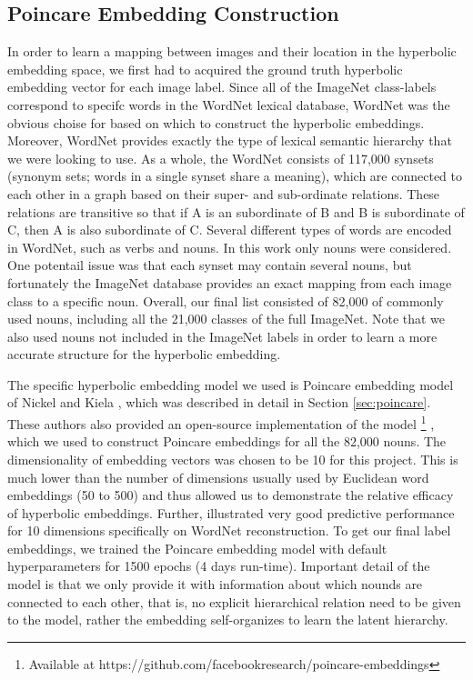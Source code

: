 \documentclass[12pt]{report}
\begin{document}
\subsection{Poincare Embedding Construction}
In order to learn a mapping between images and their location in the hyperbolic embedding space, we first had to acquired the ground truth hyperbolic embedding vector for each image label. Since all of the ImageNet class-labels correspond to specifc words in the WordNet lexical database, WordNet was the obvious choise for based on which to construct the hyperbolic embeddings. Moreover, WordNet provides exactly the type of lexical semantic hierarchy that we were looking to use. As a whole, the WordNet consists of 117,000 synsets (synonym sets; words in a single synset share a meaning), which are connected to each other in a graph based on their super- and sub-ordinate relations. These relations are transitive so that if A is an subordinate of B and B is subordinate of C, then A is also subordinate of C. Several different types of words are encoded in WordNet, such as verbs and nouns. In this work only nouns were considered. One potentail issue was that each synset may contain several nouns, but fortunately the ImageNet database provides an exact mapping from each image class to a specific noun. Overall, our final list consisted of 82,000 of commonly used nouns, including all the 21,000 classes of the full ImageNet. Note that we also used nouns not included in the ImageNet labels in order to learn a more accurate structure for the hyperbolic embedding.

The specific hyperbolic embedding model we used is Poincare embedding model of Nickel and Kiela \cite{Nickel2017}, which was described in detail in Section \ref{sec:poincare}. These authors also provided an open-source implementation of the model \footnote{\label{fb_fn} Available at https://github.com/facebookresearch/poincare-embeddings} , which we used to construct Poincare embeddings for all the 82,000 nouns. The dimensionality of embedding vectors was chosen to be 10 for this project. This is much lower than the number of dimensions usually used by Euclidean word embeddings (50 to 500) and thus allowed us to demonstrate the relative efficacy of hyperbolic embeddings. Further, \cite{Nickel2017} illustrated very good predictive performance for 10 dimensions specifically on WordNet reconstruction. To get our final label embeddings, we trained the Poincare embedding model with default hyperparameters for 1500 epochs (4 days run-time). Important detail of the model is that we only provide it with information about which nounds are connected to each other, that is, no explicit hierarchical relation need to be given to the model, rather the embedding self-organizes to learn the latent hierarchy.
\end{document}

